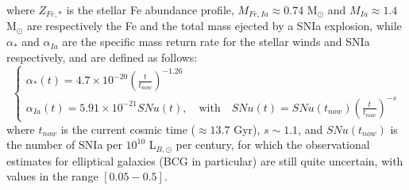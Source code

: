 \documentclass{article}
\begin{document}
where $Z_{Fe,*}$ is the stellar Fe abundance profile, $M_{Fe,Ia}\approx 0.74$ M$_\odot$ and $M_{Ia}\approx 1.4$ M$_\odot$ are respectively the Fe and the total mass ejected by a SNIa explosion, while 
$\alpha_{*}$ and $\alpha_{Ia}$ are the specific mass return rate for the stellar winds and SNIa respectively, and are defined as follows:
\begin{equation}\label{rates}
	\begin{cases}
		\alpha_{*}(t)=4.7\times 10^{-20}(\frac{t}{t_{now}})^{-1.26}\\
		\alpha_{Ia}(t)=5.91\times 10^{-21} SNu(t), \quad \text{with}\quad SNu(t)=SNu(t_{now})(\frac{t}{t_{now}})^{-s}
	\end{cases}
\end{equation}
where $t_{now}$ is the current cosmic time ($\approx 13.7$ Gyr), $s\sim 1.1$, and $SNu(t_{now})$ is the number of SNIa per $10^{10}$ L$_{B,\odot}$ per century, for which the observational estimates for elliptical galaxies (BCG in particular) are still quite uncertain, with values in the range $[0.05-0.5]$.\\
\end{document}
